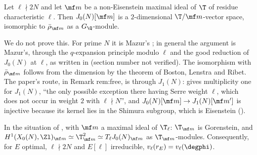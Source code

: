 \begin{theorem}\label{thm:moddeg:multiplicity-one}
Let $\ell\nmid2N$ and let $\mf m$ be a non-Eisenstein maximal ideal of $\T$ of residue characteristic $\ell$. Then $J_0(N)[\mf m]$ is a $2$-dimensional $\T/\mf m$-vector space, isomorphic to $\bar\rho_{\mf m}$ as a
$G_\Q$-module.
\end{theorem}

We do not prove this. For prime $N$ it is Mazur's \cite[Chapter II]{Mazur77}; in general the argument is Mazur's, through the $q$-expansion principle modulo $\ell$ and the good
reduction of $J_0(N)$ at $\ell$, as written in \cite[Section 5]{Ribet90} (section number not verified). The isomorphism with $\bar\rho_{\mf m}$ follows from the dimension by the theorem of Boston,
Lenstra and Ribet. The paper's route, in Remark rem:free, is through $J_1(N)$: \cite[Theorem 3.5]{RibetStein} gives multiplicity one for $J_1(N)$, ``the only possible exception there having Serre
weight $\ell$, which does not occur in weight $2$ with $\ell\nmid N$'', and $J_0(N)[\mf m]\to J_1(N)[\mf m']$ is injective because its kernel lies in the Shimura subgroup, which is Eisenstein
().

\begin{theorem}\label{thm:moddeg:gorenstein}
In the situation of , with $\mf m$ a maximal ideal of $\T_\ell$: $\T_{\mf m}$ is Gorenstein, and
$H^1(X_0(N),\Zl)_{\mf m}\simeq\T_{\mf m}^2\simeq T_\ell J_0(N)_{\mf m}$ as $\T_{\mf m}$-modules. Consequently, for $E$ optimal, $\ell\nmid2N$ and $E[\ell]$ irreducible, $v_\ell(r_E)=v_\ell(\degphi)$.
\end{theorem}

